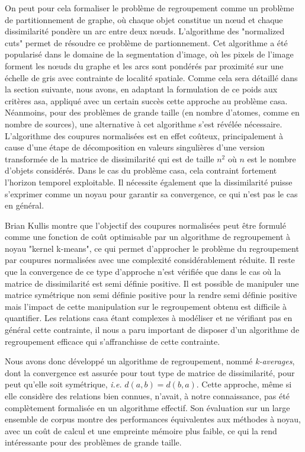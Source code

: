 On peut pour cela formaliser le problème de regroupement comme un problème de partitionnement de graphe, où chaque objet constitue un n\oe{}ud et chaque dissimilarité pondère un arc entre deux n\oe{}uds. L'algorithme des "normalized cuts" permet de résoudre ce problème de partionnement. Cet algorithme a été popularisé dans le domaine de la segmentation d'image\cite{shi2000normalized}, où les pixels de l'image forment les n\oe{}uds du graphe et les arcs sont pondérés par proximité sur une échelle de gris avec contrainte de localité spatiale. Comme cela sera détaillé dans la section suivante, nous avons, en adaptant la formulation de ce poids aux critères asa, appliqué avec un certain succès cette approche au problème casa. Néanmoins, pour des problèmes de grande taille (en nombre d'atomes, comme en nombre de sources), une alternative à cet algorithme s'est révélée nécessaire. L'algorithme des coupures normalisées est en effet coûteux, principalement à cause d'une étape de décomposition en valeurs singulières d'une version transformée de la matrice de dissimilarité qui est de taille $n^2$ où $n$ est le nombre d'objets considérés. Dans le cas du problème casa, cela contraint fortement l'horizon temporel exploitable. Il nécessite également que la dissimilarité puisse s'exprimer comme un noyau pour garantir sa convergence, ce qui n'est pas le cas en général.

Brian Kullis montre que l'objectif des coupures normalisées peut être formulé comme une fonction de coût optimisable par un algorithme de regroupement à noyau "kernel k-means", ce qui permet d'approcher le problème du regroupement par coupures normalisées avec une complexité considérablement réduite. Il reste que la convergence de ce type d'approche n'est vérifiée que dans le cas où la matrice de dissimilarité est semi définie positive. Il est possible de manipuler une matrice symétrique non semi définie positive pour la rendre semi définie positive\cite{optimal2003} mais l'impact de cette manipulation sur le regroupement obtenu est difficile à quantifier. Les relations casa étant complexes à modéliser et ne vérifiant pas en général cette contrainte, il nous a paru important de disposer d'un algorithme de regroupement efficace qui s'affranchisse de cette contrainte.

Nous avons donc développé un algorithme de regroupement, nommé \textsl{k-averages}, dont la convergence est assurée pour tout type de matrice de dissimilarité, pour peut qu'elle soit symétrique, \textit{i.e.} $d(a, b) = d(b,a)$. Cette approche, même si elle considère des relations bien connues, n'avait, à notre connaissance, pas été complètement formalisée  en un algorithme effectif. Son évaluation sur un large ensemble de corpus\cite{UCRArchive} montre des performances équivalentes aux méthodes à noyau, avec un coût de calcul et une empreinte mémoire plus faible, ce qui la rend intéressante pour des problèmes de grande taille\cite{rossignol2018efficient}.

